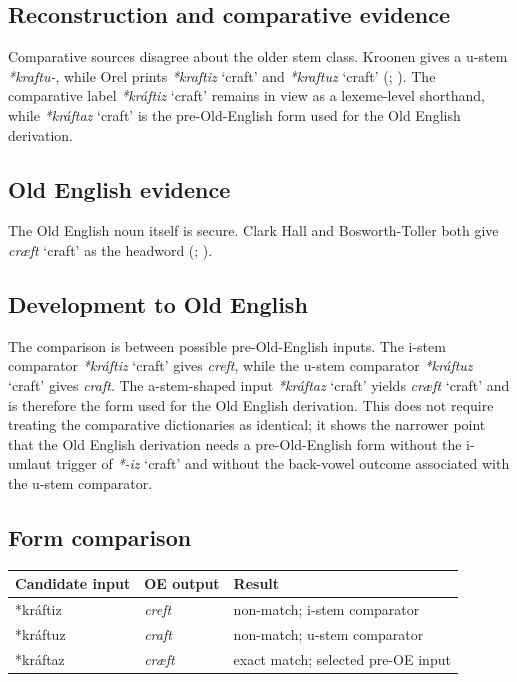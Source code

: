 \documentclass[
  british,
  a4paper,
  openany]{book}
\newcounter{none} %
\providecommand{\Recon}[1]{\emph{*#1}}
{\catcode`→=\active \global\def→{\ensuremath{\rightarrow}}}
\providecommand{\Recon}[1]{\emph{*#1}}
{\catcode`→=\active \global\def→{\ensuremath{\rightarrow}}}
\begin{document}
\subsection{Reconstruction and comparative
evidence}\label{reconstruction-and-comparative-evidence-77}

Comparative sources disagree about the older stem class. Kroonen gives a
u-stem \emph{*kraftu-}, while Orel prints \Recon{kraftiz} `craft' and
\Recon{kraftuz} `craft' (;
). The comparative label
\Recon{kráftiz} `craft' remains in view as a lexeme-level shorthand,
while \Recon{kráftaz} `craft' is the pre-Old-English form used for the
Old English derivation.

\subsection{Old English evidence}\label{old-english-evidence-77}

The Old English noun itself is secure. Clark Hall and Bosworth-Toller
both give \emph{cræft} `craft' as the headword
(;
).

\subsection{Development to Old
English}\label{development-to-old-english-77}

The comparison is between possible pre-Old-English inputs. The i-stem
comparator \Recon{kráftiz} `craft' gives \emph{creft}, while the u-stem
comparator \Recon{kráftuz} `craft' gives \emph{craft}. The a-stem-shaped
input \Recon{kráftaz} `craft' yields \emph{cræft} `craft' and is
therefore the form used for the Old English derivation. This does not
require treating the comparative dictionaries as identical; it shows the
narrower point that the Old English derivation needs a pre-Old-English
form without the i-umlaut trigger of \Recon{-iz} `craft' and without the
back-vowel outcome associated with the u-stem comparator.

\subsection{Form comparison}\label{form-comparison-5}

{\def\LTcaptype{none} %
\begin{longtable}[]{@{}lll@{}}
\toprule\noalign{}
Candidate input & OE output & Result \\
\midrule\noalign{}
\endhead
\bottomrule\noalign{}
\endlastfoot
*kráftiz & \emph{creft} & non-match; i-stem comparator \\
*kráftuz & \emph{craft} & non-match; u-stem comparator \\
*kráftaz & \emph{cræft} & exact match; selected pre-OE input \\
\end{longtable}
}
\end{document}
